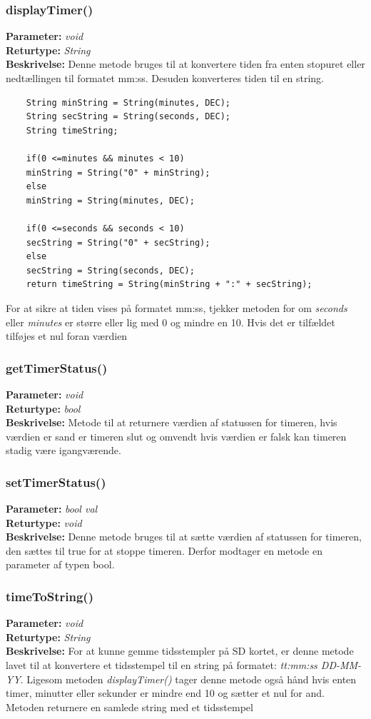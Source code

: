 \subsubsection{displayTimer()}
\textbf{Parameter: } \textit{void}
\\ \textbf{Returtype: } \textit{ String}
\\ \textbf{Beskrivelse: } Denne metode bruges til at konvertere tiden fra enten stopuret eller nedtællingen til formatet mm:ss. Desuden konverteres tiden til en string. 
\begin{lstlisting}
	String minString = String(minutes, DEC);
	String secString = String(seconds, DEC);
	String timeString;
	
	if(0 <=minutes && minutes < 10)
	minString = String("0" + minString);
	else
	minString = String(minutes, DEC);
	
	if(0 <=seconds && seconds < 10)
	secString = String("0" + secString);
	else
	secString = String(seconds, DEC);
	return timeString = String(minString + ":" + secString);
\end{lstlisting}
For at sikre at tiden vises på formatet mm:ss, tjekker metoden for om \textit{seconds} eller \textit{minutes} er større eller lig med 0 og mindre en 10. Hvis det er tilfældet tilføjes et nul foran værdien 

\subsubsection{getTimerStatus()}
\textbf{Parameter: } \textit{void}
\\ \textbf{Returtype: } \textit{bool}
\\ \textbf{Beskrivelse: } Metode til at returnere værdien af statussen for timeren, hvis værdien er sand er timeren slut og omvendt hvis værdien er falsk kan timeren stadig være igangværende. 

\subsubsection{setTimerStatus()}
\textbf{Parameter: } \textit{bool val}
\\ \textbf{Returtype: } \textit{void}
\\ \textbf{Beskrivelse: } Denne metode bruges til at sætte værdien af statussen for timeren, den sættes til true for at stoppe timeren. Derfor modtager en metode en parameter af typen bool. 

\subsubsection{timeToString()}
\textbf{Parameter: } \textit{void}
\\ \textbf{Returtype: } \textit{String}
\\ \textbf{Beskrivelse: } For at kunne gemme tidsstempler på SD kortet, er denne metode lavet til at konvertere et tidsstempel til en string på formatet: \textit{tt:mm:ss DD-MM-YY}. Ligesom metoden \textit{displayTimer()} tager denne metode også hånd hvis enten timer, minutter eller sekunder er mindre end 10 og sætter et nul for and. Metoden returnere en samlede string med et tidsstempel 

